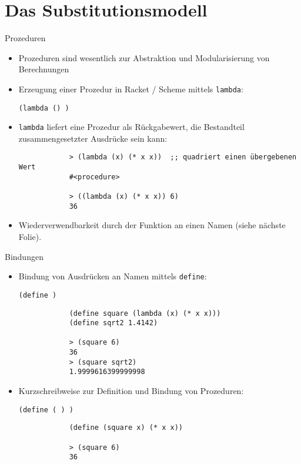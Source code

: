 \section{Das Substitutionsmodell}
\begin{frame}[t,fragile]{Prozeduren}
	\begin{itemize}
		\item Prozeduren sind wesentlich zur Abstraktion und Modularisierung von Berechnungen \pause
		\item Erzeugung einer Prozedur in Racket / Scheme mittels \texttt{lambda}:
		\begin{center}
			\texttt{(lambda () )}
		\end{center} \pause
		\item \texttt{lambda} liefert eine Prozedur als Rückgabewert, die Bestandteil zusammengesetzter Ausdrücke sein kann:
		\begin{verbatim}
			> (lambda (x) (* x x))	;; quadriert einen übergebenen Wert
			#<procedure>
			
			> ((lambda (x) (* x x)) 6)
			36
		\end{verbatim}
		\pause
		\item Wiederverwendbarkeit durch  der Funktion an einen Namen (siehe nächste Folie).
	\end{itemize}
\end{frame}

\begin{frame}[t,fragile]{Bindungen}
	\begin{itemize}
		\item Bindung von Ausdrücken an Namen mittels \texttt{define}:
		\begin{center}
			\texttt{(define  )}
		\end{center} \pause
		\begin{verbatim}
			(define square (lambda (x) (* x x)))
			(define sqrt2 1.4142)
			
			> (square 6)
			36
			> (square sqrt2)
			1.9999616399999998
		\end{verbatim}
		\pause
		\item Kurzschreibweise zur Definition und Bindung von Prozeduren:
		\begin{center}
			\texttt{(define ( ) )}
		\end{center}
		\begin{verbatim}
			(define (square x) (* x x))
			
			> (square 6)
			36
		\end{verbatim}
	\end{itemize}
\end{frame}

